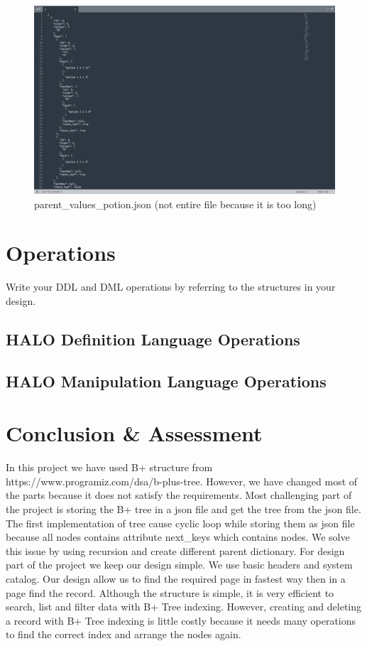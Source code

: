 \documentclass{article}
\begin{document}
\begin{figure}[H]
    \centering
    \includegraphics[width=.8\textwidth]{figures/parent_values.jpg}
    \caption{parent\_values\_potion.json (not entire file because it is too long)}
\end{figure}

\section{Operations}
\label{sec:operations}
Write your DDL and DML operations by referring to the structures in your design.

\subsection{HALO Definition Language Operations}

\subsection{HALO Manipulation Language Operations}

\section{Conclusion \& Assessment}
\label{sec:conclusion}
In this project we have used B+ structure from https://www.programiz.com/dsa/b-plus-tree. However, we have changed most of the parts because it does not satisfy the requirements. Most challenging part of the project is storing the B+ tree in a json file and get the tree from the json file. The first implementation of tree cause cyclic loop while storing them as json file because all nodes contains attribute next\_keys which contains nodes. We solve this issue by using recursion and create different parent dictionary. For design part of the project we keep our design simple. We use basic headers and system catalog. Our design allow us to find the required page in fastest way then in a page find the record. Although the structure is simple, it is very efficient to search, list and filter data with B+ Tree indexing. However, creating and deleting a record with B+ Tree indexing is little costly because it needs many operations to find the correct index and arrange the nodes again. 
\end{document}
